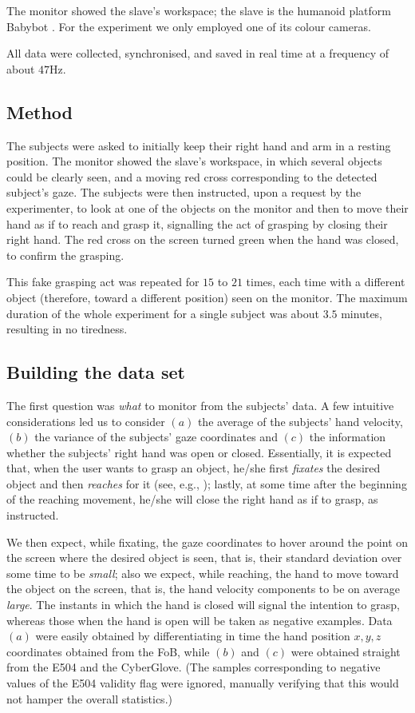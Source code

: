 \documentclass{article}
\begin{document}
The monitor showed the slave's workspace; the slave is the humanoid
platform Babybot \cite{babybotHum2005}. For the experiment we only
employed one of its colour cameras.

All data were collected, synchronised, and saved in real time at a
frequency of about $47$Hz.

\subsection{Method}

The subjects were asked to initially keep their right hand and arm in
a resting position. The monitor showed the slave's workspace, in which
several objects could be clearly seen, and a moving red cross
corresponding to the detected subject's gaze. The subjects were then
instructed, upon a request by the experimenter, to look at one of the
objects on the monitor and then to move their hand as if to reach and
grasp it, signalling the act of grasping by closing their right
hand. The red cross on the screen turned green when the hand was
closed, to confirm the grasping.

This fake grasping act was repeated for $15$ to $21$ times, each time
with a different object (therefore, toward a different position) seen
on the monitor. The maximum duration of the whole experiment for a
single subject was about $3.5$ minutes, resulting in no tiredness.

\subsection{Building the data set}
\label{subsec:dataset}

The first question was \emph{what} to monitor from the subjects'
data. A few intuitive considerations led us to consider $(a)$ the
average of the subjects' hand velocity, $(b)$ the variance of the
subjects' gaze coordinates and $(c)$ the information whether the
subjects' right hand was open or closed. Essentially, it is expected
that, when the user wants to grasp an object, he/she first
\emph{fixates} the desired object and then \emph{reaches} for it (see,
e.g., \cite{johansson01}); lastly, at some time after the beginning of
the reaching movement, he/she will close the right hand as if to
grasp, as instructed.

We then expect, while fixating, the gaze coordinates to hover around
the point on the screen where the desired object is seen, that is,
their standard deviation over some time to be \emph{small}; also we
expect, while reaching, the hand to move toward the object on the
screen, that is, the hand velocity components to be on average
\emph{large}. The instants in which the hand is closed will signal the
intention to grasp, whereas those when the hand is open will be taken
as negative examples. Data $(a)$ were easily obtained by
differentiating in time the hand position $x,y,z$ coordinates obtained
from the FoB, while $(b)$ and $(c)$ were obtained straight from the
E504 and the CyberGlove. (The samples corresponding to negative values
of the E504 validity flag were ignored, manually verifying that this
would not hamper the overall statistics.)
\end{document}
